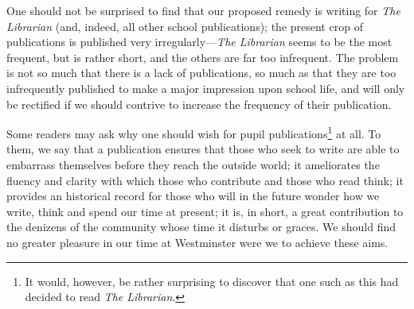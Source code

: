 \begin{multicols}{2}
One should not be surprised to find that our proposed remedy is writing for 
\textit{The Librarian} (and, indeed, all other school publications); the present
crop of publications is published very irregularly---\textit{The Librarian}
seems to be the most frequent, but is rather short, and the others are far too
infrequent. The problem is not so much that there is a lack of publications, so
much as that they are too infrequently published to make a major impression upon
school life, and will only be rectified if we should contrive to increase the frequency of their publication.

Some readers may ask why one should wish for pupil publications\footnote{It would, however, be rather surprising to discover that one such 
as this had decided to read \textit{The Librarian}.} at all. To them, we say that a 
publication ensures that those who seek to write are able to embarrass themselves
before they reach the outside world; it ameliorates the fluency and clarity with
which those who contribute and those who read think; it provides an historical
record for those who will in the future wonder how we write, think and spend
our time at present; it is, in short, a great contribution to the denizens of
the community whose time it disturbs or graces. We should find no
greater pleasure in our time at Westminster were we to achieve these aims.

\end{multicols}